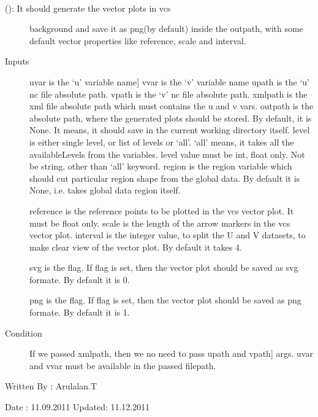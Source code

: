 \documentclass[letterpaper,10pt,english]{sphinxmanual}
\begin{document}
\begin{fulllineitems}
\label{diagnosis:generate_winds_plots.genVectorPlots}~\begin{description}
\item[{{\hyperref[diagnosis:generate_winds_plots.genVectorPlots]{}} (): It should generate the vector plots in vcs}] \leavevmode
background and save it as png(by default) inside the outpath,
with some default vector properties like reference, scale and
interval.

\item[{Inputs}] \leavevmode{[}uvar is the `u' variable name{]}
vvar is the `v' variable name
upath is the `u' nc file absolute path.
vpath is the `v' nc file absolute path.
xmlpath is the xml file absolute path which must contains the
u and v vars.
outpath is the absolute path, where the generated plots should be
stored. By default, it is None. It means, it should save in the
current working directory itself.
level is either single level, or list of levels or `all'.
`all' means, it takes all the availableLevels from the variables.
level value must be int, float only. Not be string, other than
`all' keyword.
region is the region variable which should cut particular region
shape from the global data. By default it is None, i.e. takes
global data region itself.

reference is the reference points to be plotted in the vcs
vector plot. It must be float only.
scale is the length of the arrow markers in the vcs vector plot.
interval is the integer value, to split the U and V datasets,
to make clear view of the vector plot. By default it takes 4.

svg is the flag. If flag is set, then the vector plot should be
saved as svg formate. By default it is 0.

png is the flag. If flag is set, then the vector plot should be
saved as png formate. By default it is 1.

\item[{Condition}] \leavevmode{[}If we passed xmlpath, then we no need to pass upath and vpath{]}
args. uvar and vvar must be available in the passed filepath.

\end{description}

Written By : Arulalan.T

Date : 11.09.2011
Updated: 11.12.2011

\end{fulllineitems}
\end{document}
